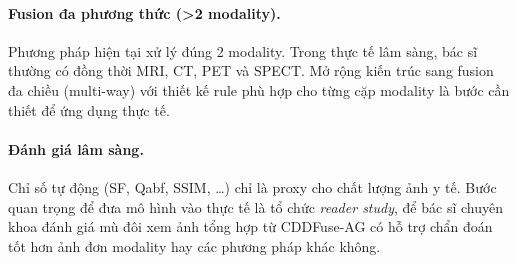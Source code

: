 \paragraph{Fusion đa phương thức (>2 modality).}
Phương pháp hiện tại xử lý đúng 2 modality. Trong thực tế lâm sàng, bác sĩ thường có đồng thời MRI, CT, PET và SPECT. Mở rộng kiến trúc sang fusion đa chiều (multi-way) với thiết kế rule phù hợp cho từng cặp modality là bước cần thiết để ứng dụng thực tế.

\paragraph{Đánh giá lâm sàng.}
Chỉ số tự động (SF, Qabf, SSIM, \ldots) chỉ là proxy cho chất lượng ảnh y tế. Bước quan trọng để đưa mô hình vào thực tế là tổ chức \emph{reader study}, để bác sĩ chuyên khoa đánh giá mù đôi xem ảnh tổng hợp từ CDDFuse-AG có hỗ trợ chẩn đoán tốt hơn ảnh đơn modality hay các phương pháp khác không.
